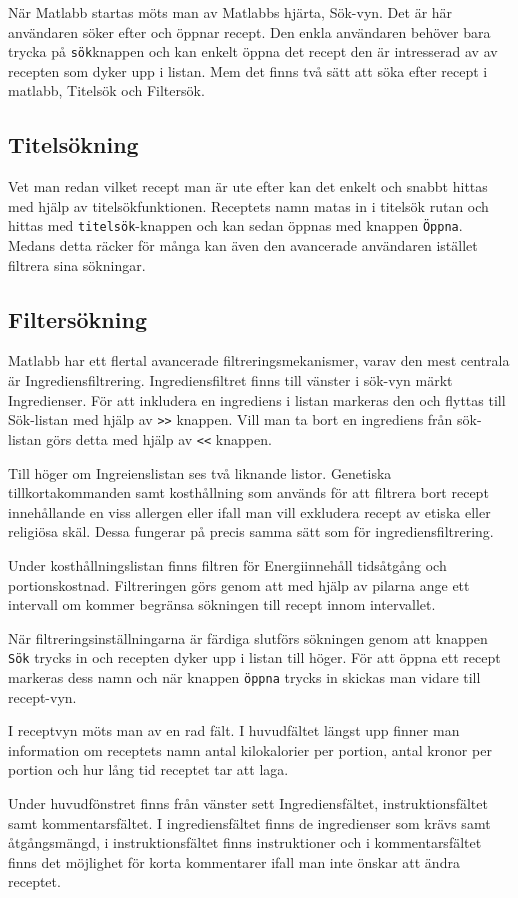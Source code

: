 När Matlabb startas möts man av Matlabbs hjärta, Sök-vyn. Det är här
användaren söker efter och öppnar recept. Den enkla användaren behöver
bara trycka på \verb+sök+knappen och kan enkelt öppna det recept den är
intresserad av av recepten som dyker upp i listan. Mem det finns två
sätt att söka efter recept i matlabb, Titelsök och Filtersök.

\subsection{Titelsökning}
Vet man redan vilket recept man är ute efter kan det enkelt och snabbt
hittas med hjälp av titelsökfunktionen. Receptets namn matas in i
titelsök rutan och hittas med \verb+titelsök+-knappen och kan sedan öppnas
med knappen \verb+Öppna+. Medans detta räcker för många kan även den
avancerade användaren istället filtrera sina sökningar.

\subsection{Filtersökning}

Matlabb har ett flertal avancerade filtreringsmekanismer, varav den
mest centrala är Ingrediensfiltrering. Ingrediensfiltret finns till
vänster i sök-vyn märkt Ingredienser. För att inkludera en ingrediens
i listan markeras den och flyttas till Sök-listan med hjälp av \verb+>>+
knappen. Vill man ta bort en ingrediens från sök-listan görs detta med
hjälp av \verb+<<+ knappen.

Till höger om Ingreienslistan ses två liknande listor. Genetiska
tillkortakommanden samt kosthållning som används för att filtrera bort
recept innehållande en viss allergen eller ifall man vill exkludera
recept av etiska eller religiösa skäl. Dessa fungerar på precis samma
sätt som för ingrediensfiltrering.

Under kosthållningslistan finns filtren för Energiinnehåll tidsåtgång
och portionskostnad. Filtreringen görs genom att med hjälp av pilarna
ange ett intervall om kommer begränsa sökningen till recept innom
intervallet.

När filtreringsinställningarna är färdiga slutförs sökningen genom att
knappen \verb+Sök+ trycks in och recepten dyker upp i listan till höger. För
att öppna ett recept markeras dess namn och när knappen \verb+öppna+ trycks
in skickas man vidare till recept-vyn.  

I receptvyn möts man av en rad fält. I huvudfältet längst upp finner
man information om receptets namn antal kilokalorier per portion,
antal kronor per portion och hur lång tid receptet tar att laga.

Under huvudfönstret finns från vänster sett Ingrediensfältet,
instruktionsfältet samt kommentarsfältet. I ingrediensfältet finns de
ingredienser som krävs samt åtgångsmängd, i instruktionsfältet finns
instruktioner och i kommentarsfältet finns det möjlighet för korta
kommentarer ifall man inte önskar att ändra receptet.
